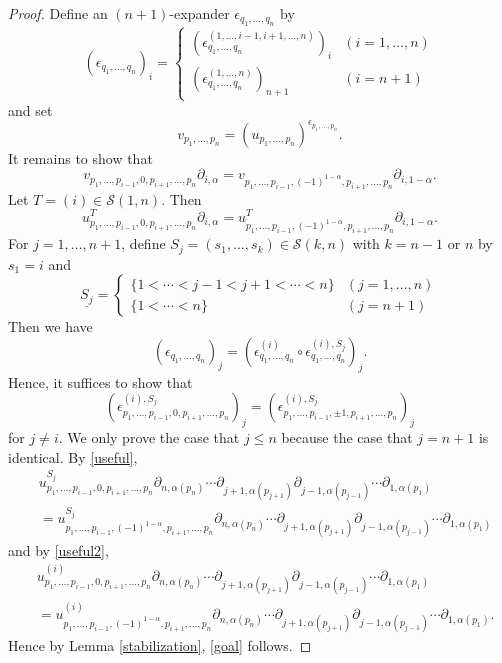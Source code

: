 \documentclass[oneside, 12pt]{amsart}
\numberwithin{equation}{section}
\theoremstyle{plain}
\theoremstyle{definition}
\theoremstyle{remark}
\begin{document}
\begin{proof}
		
		
		Define an $(n+1)$-expander $\epsilon_{q_1,\ldots,q_n}$ by
		\[
		(\epsilon_{q_1,\ldots,q_n})_i=
		\begin{cases}
			(\epsilon_{q_1,\ldots,q_n}^{(1,\ldots,i-1,i+1,\ldots,n)})_i&(i=1,\ldots,n)\\
			(\epsilon_{q_1,\ldots,q_n}^{(1,\ldots,n)})_{n+1}&(i=n+1)
		\end{cases}
		\]
		and set
		\[
		v_{p_1,\ldots,p_n}=(u_{p_1,\ldots,p_n})^{\epsilon_{p_1,\ldots,p_n}}.
		\]
		It remains to show that
		\begin{equation}
			\label{goal}
			v_{p_1,\ldots,p_{i-1},0,p_{i+1},\ldots,p_n}\partial_{i,\alpha}=v_{p_1,\ldots,p_{i-1},(-1)^{1-\alpha},p_{i+1},\ldots,p_n}\partial_{i,1-\alpha}.
		\end{equation}
		Let $T=(i)\in\mathcal{S}(1,n)$. Then
		\begin{equation}
			\label{useful2}
			u_{p_1,\ldots,p_{i-1},0,p_{i+1},\ldots,p_n}^T\partial_{i,\alpha}=u_{p_1,\ldots,p_{i-1},(-1)^{1-\alpha},p_{i+1},\ldots,p_n}^T\partial_{i,1-\alpha}.
		\end{equation}
		For $j=1,\ldots,n+1$, define $S_j=(s_1,\ldots,s_k)\in\mathcal{S}(k,n)$ with $k=n-1$ or $n$ by $s_1=i$ and
		\[
		\underline{S_j}=
		\begin{cases}
			\{1<\cdots<j-1<j+1<\cdots<n\}&(j=1,\ldots,n)\\
			\{1<\cdots<n\}&(j=n+1)
		\end{cases}
		\]
		Then we have
		\[
		(\epsilon_{q_1,\ldots,q_n})_j=(\epsilon_{q_1,\ldots,q_n}^{(i)}\circ\epsilon_{q_1,\ldots,q_n}^{(i),S_j})_j.
		\]
		Hence, it suffices to show that
		\begin{equation}
			\label{goal2}
			(\epsilon_{p_1,\ldots,p_{i-1},0,p_{i+1},\ldots,p_n}^{(i),S_j})_j=(\epsilon_{p_1,\ldots,p_{i-1},\pm1,p_{i+1},\ldots,p_n}^{(i),S_j})_j
		\end{equation}
		for $j\ne i$. We only prove the case that $j\le n$ because the case that $j=n+1$ is identical. By \eqref{useful},
		\begin{align*}
			&u_{p_1,\ldots,p_{i-1},0,p_{i+1},\ldots,p_n}^{S_j}\partial_{n,\alpha(p_n)}\cdots\partial_{j+1,\alpha(p_{j+1})}\partial_{j-1,\alpha(p_{j-1})}\cdots\partial_{1,\alpha(p_1)}\\
			&=u_{p_1,\ldots,p_{i-1},(-1)^{1-\alpha},p_{i+1},\ldots,p_n}^{S_j}\partial_{n,\alpha(p_n)}\cdots\partial_{j+1,\alpha(p_{j+1})}\partial_{j-1,\alpha(p_{j-1})}\cdots\partial_{1,\alpha(p_1)}
		\end{align*}
		and by \eqref{useful2},
		\begin{align*}
			&u_{p_1,\ldots,p_{i-1},0,p_{i+1},\ldots,p_n}^{(i)}\partial_{n,\alpha(p_n)}\cdots\partial_{j+1,\alpha(p_{j+1})}\partial_{j-1,\alpha(p_{j-1})}\cdots\partial_{1,\alpha(p_1)}\\
			&=u_{p_1,\ldots,p_{i-1},(-1)^{1-\alpha},p_{i+1},\ldots,p_n}^{(i)}\partial_{n,\alpha(p_n)}\cdots\partial_{j+1,\alpha(p_{j+1})}\partial_{j-1,\alpha(p_{j-1})}\cdots\partial_{1,\alpha(p_1)}.
		\end{align*}
		Hence by Lemma \ref{stabilization}, \eqref{goal} follows.
	\end{proof}
	
\end{document}
